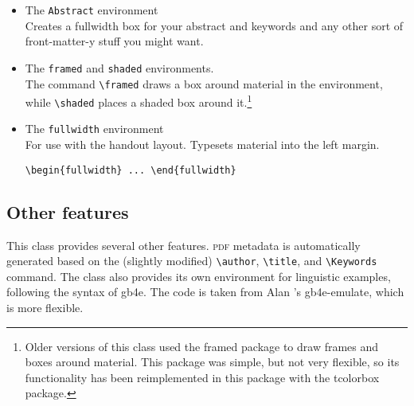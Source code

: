 \documentclass[11pt, tipa, color]{./lingdoc}
\newcommand{\Command}[1]{\texttt{\textbackslash{}#1}}
\newcommand{\Package}[1]{\textsf{{#1}}}
\begin{document}
      \begin{itemize}[leftmargin=0em]
	\item The \texttt{Abstract} environment\\
	  Creates a fullwidth box for your abstract and keywords and any other sort of front-matter-y stuff you might want. 
	
	\item The \texttt{framed} and \texttt{shaded} environments. \\
	  The command \Command{framed} draws a box around material in the environment, while \Command{shaded} places a shaded box around it.\footnote{Older versions of this class used the \Package{framed} package to draw frames and boxes around material. This package was simple, but not very flexible, so its functionality has been reimplemented in this package with the \Package{tcolorbox} package.}
	  
	\item The \texttt{fullwidth} environment \\
	  For use with the handout layout. Typesets material into the left margin. \begin{verbatim}\begin{fullwidth} ... \end{fullwidth}\end{verbatim}
	  

	\end{itemize}


  \subsection{Other features}
  
    This class provides several other features. \textsc{pdf} metadata is automatically generated based on the (slightly modified) \Command{author}, \Command{title}, and \Command{Keywords} command. The class also provides its own environment for linguistic examples, following the syntax of \Package{gb4e}. The code is taken from Alan \citeauthor{Munn:2010}'s \Package{gb4e-emulate}, which is more flexible. 
    
% 
\end{document}
